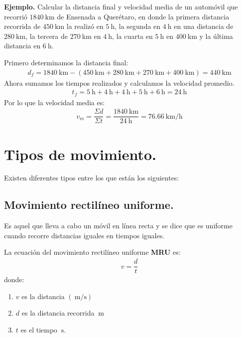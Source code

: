\documentclass[14pt]{extarticle}
\begin{document}
\textbf{Ejemplo. } Calcular la distancia final y velocidad media de un automóvil que recorrió $\SI{1840}{\kilo\meter}$ de Ensenada a Querétaro, en donde la primera distancia recorrida de $\SI{450}{\kilo\meter}$ la realizó en $\SI{5}{\hour}$, la segunda en $\SI{4}{\hour}$ en una distancia de $\SI{280}{\kilo\meter}$, la tercera de $\SI{270}{\kilo\meter}$ en $\SI{4}{\hour}$, la cuarta en $\SI{5}{\hour}$ en $\SI{400}{\kilo\meter}$ y la última distancia en $\SI{6}{\hour}$.

Primero determinamos la distancia final:
\begin{align*}
d_{f} = \SI{1840}{\kilo\meter} - (\SI{450}{\kilo\meter} + \SI{280}{\kilo\meter} + \SI{270}{\kilo\meter} + \SI{400}{\kilo\meter}) = \SI{440}{\kilo\meter}
\end{align*}
Ahora sumamos los tiempos realizados y calculamos la velocidad promedio.
\begin{align*}
t_{f} = \SI{5}{\hour} + \SI{4}{\hour} + \SI{4}{\hour} + \SI{5}{\hour} + \SI{6}{\hour} = \SI{24}{\hour}
\end{align*}
Por lo que la velocidad media es:
\begin{align*}
v_{m} =  \dfrac{\Sigma d}{\Sigma t} = \dfrac{\SI{1840}{\kilo\meter}}{\SI{24}{\hour}} = \SI{76.66}{\kilo\meter\per\hour}
\end{align*}

\section{Tipos de movimiento.}

Existen diferentes tipos entre los que están los siguientes:

\subsection{Movimiento rectilíneo uniforme.}

Es aquel que lleva a cabo un móvil en línea recta y se dice que es uniforme cuando recorre distancias iguales en tiempos iguales.
\par
La ecuación del movimiento rectilíneo uniforme \textbf{MRU} es:
\begin{align*}
v = \dfrac{d}{t}
\end{align*}
donde:
\begin{enumerate}
\item $v$ es la distancia $(\SI{}{\meter\per\second})$
\item $d$ es la distancia recorrida $\SI{}{\meter}$
\item $t$ es el tiempo $\SI{}{\second}$.
\end{enumerate}
\end{document}
